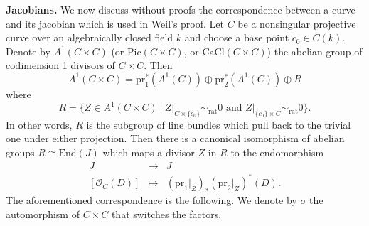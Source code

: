 \noindent
{\bf Jacobians.}
We now discuss without proofs the correspondence between a curve and its
jacobian which is used in Weil's proof. Let $C$ be a nonsingular projective
curve over an algebraically closed field $k$ and choose a base point $c_0 \in
C(k)$. Denote by $A^1(C \times C)$ (or $\text{Pic} (C\times C)$, or
$\text{CaCl}(C\times C)$) the abelian group of codimension 1 divisors of
$C\times C$. Then
$$
A^1(C\times C) = \text{pr}_1^* (A^1(C)) \oplus \text{pr}_2^* (A^1(C)) \oplus R
$$
where
$$
R = \{ Z \in A^1(C\times C) \ |
\ Z|_{C \times \{c_0\}} \sim_\text{rat} 0
\text{ and }
Z|_{\{c_0\} \times C} \sim_\text{rat} 0 \}.
$$
In other words,
$R$ is the subgroup of line bundles which pull back to the trivial one under
either projection. Then there is a canonical isomorphism of abelian groups $R
\cong \text{End}(J)$ which maps a divisor $Z$ in $R$ to the endomorphism
$$
\begin{matrix}
J & \to & J \\
\left[ \mathcal{O}_C(D) \right] & \mapsto & (\text{pr}_1 |_Z)_* (\text{pr}_2
|_Z)^* (D).
\end{matrix}
$$
The aforementioned correspondence is the following. We denote by $\sigma$ the
automorphism of $C \times C$ that switches the factors.
